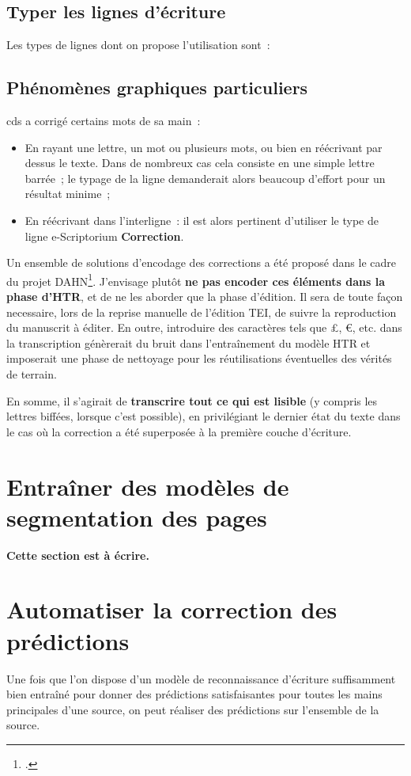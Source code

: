 \documentclass[a4paper,12pt,twoside]{book}
\begin{document}
			\subsection{Typer les lignes d'écriture}
				Les types de lignes dont on propose l'utilisation sont~:
						
			\subsection{Phénomènes graphiques particuliers}
			\gls{cds} a corrigé certains mots de sa main~:
			
			\begin{itemize}
				\item En rayant une lettre, un mot ou plusieurs mots, ou bien en réécrivant par dessus le texte. Dans de nombreux cas cela consiste en une simple lettre barrée~; le typage de la ligne demanderait alors beaucoup d'effort pour un résultat minime~;
				\item En réécrivant dans l'interligne~: il est alors pertinent d'utiliser le type de ligne e-Scriptorium \textbf{Correction}.
			\end{itemize}
			
			Un ensemble de solutions d'encodage des corrections a été proposé dans le cadre du projet DAHN\footcite{chiffoleauFewTipsReading}. J'envisage plutôt \textbf{ne pas encoder ces éléments dans la phase d'HTR}, et de ne les aborder que la phase d'édition. Il sera de toute façon necessaire, lors de la reprise manuelle de l'édition TEI, de suivre la reproduction du manuscrit à éditer. En outre, introduire des caractères tels que £, €, etc. dans la transcription génèrerait du bruit dans l'entraînement du modèle HTR et imposerait une phase de nettoyage pour les réutilisations éventuelles des vérités de terrain.
			
			En somme, il s'agirait de \textbf{transcrire tout ce qui est lisible} (y compris les lettres biffées, lorsque c'est possible), en privilégiant le dernier état du texte dans le cas où la correction a été superposée à la première couche d'écriture.
		
		\section{Entraîner des modèles de segmentation des pages}
       		\textbf{Cette section est à écrire.}
			
		\section{Automatiser la correction des prédictions}
			Une fois que l'on dispose d'un modèle de reconnaissance d'écriture suffisamment bien entraîné pour donner des prédictions satisfaisantes pour toutes les mains principales d'une source, on peut réaliser des prédictions sur l'ensemble de la source.
			
\end{document}
